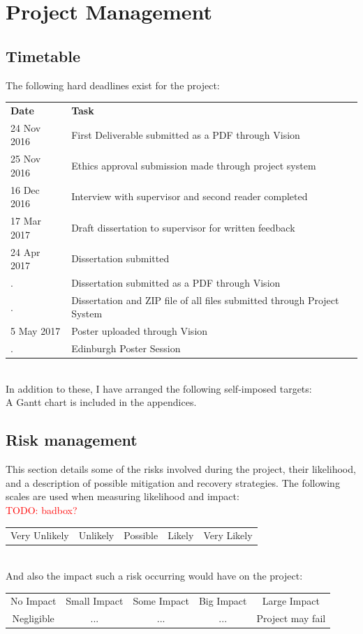 \documentclass[a4paper,11pt]{report}
\newcommand{\todo}[1]{\textcolor{red}{TODO: #1}}
\begin{document}

\chapter{Project Management}
\section{Timetable}
The following hard deadlines exist for the project:\\
\begin{tabularx}{\textwidth}{lX}
\textbf{Date} & \textbf{Task}\\
24 Nov 2016 & First Deliverable submitted as a PDF through Vision\\
25 Nov 2016 & Ethics approval submission made through project system\\
16 Dec 2016 & Interview with supervisor and second reader completed\\
17 Mar 2017 & Draft dissertation to supervisor for written feedback\\
24 Apr 2017 & Dissertation submitted\\
. & Dissertation submitted as a PDF through Vision\\
. & Dissertation and ZIP file of all files submitted through Project System\\
 5 May 2017 & Poster uploaded through Vision\\
. & Edinburgh Poster Session
\end{tabularx}\\
In addition to these, I have arranged the following self-imposed targets:\\
A Gantt chart is included in the appendices.

\section{Risk management}
This section details some of the risks involved during the project, their likelihood, and a description of possible mitigation and recovery strategies. The following scales are used when measuring likelihood and impact:\\\todo{badbox?}
\begin{tabular}{c|c|c|c|c}
Very Unlikely & Unlikely & Possible & Likely & Very Likely
\end{tabular}\\
And also the impact such a risk occurring would have on the project:\\
\begin{tabular}{c|c|c|c|c}
 No Impact & Small Impact & Some Impact & Big Impact & Large Impact\\
 Negligible & ... & ... & ... & Project may fail
\end{tabular}\\
\end{document}
